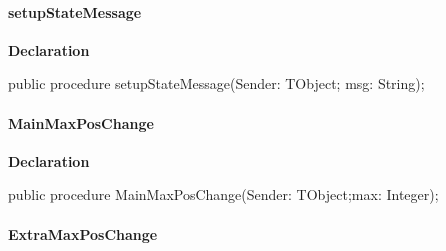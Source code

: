 \documentclass{report}
\newif\ifpdf
\begin{document}
\paragraph*{setupStateMessage}\hspace*{\fill}

\label{igobase.TIWizFrm-setupStateMessage}
\begin{list}{}{
\setlength{\itemindent}{0cm}
\setlength{\listparindent}{0cm}
\setlength{\leftmargin}{\evensidemargin}
\addtolength{\leftmargin}{\tmplength}
\settowidth{\labelsep}{X}
\addtolength{\leftmargin}{\labelsep}
\setlength{\labelwidth}{\tmplength}
}
\item[\textbf{Declaration}\hfill]
\ifpdf
\begin{flushleft}
\fi
\begin{ttfamily}
public procedure setupStateMessage(Sender: TObject; msg: String);\end{ttfamily}

\ifpdf
\end{flushleft}
\fi

\end{list}
\paragraph*{MainMaxPosChange}\hspace*{\fill}

\label{igobase.TIWizFrm-MainMaxPosChange}
\begin{list}{}{
\setlength{\itemindent}{0cm}
\setlength{\listparindent}{0cm}
\setlength{\leftmargin}{\evensidemargin}
\addtolength{\leftmargin}{\tmplength}
\settowidth{\labelsep}{X}
\addtolength{\leftmargin}{\labelsep}
\setlength{\labelwidth}{\tmplength}
}
\item[\textbf{Declaration}\hfill]
\ifpdf
\begin{flushleft}
\fi
\begin{ttfamily}
public procedure MainMaxPosChange(Sender: TObject;max: Integer);\end{ttfamily}

\ifpdf
\end{flushleft}
\fi

\end{list}
\paragraph*{ExtraMaxPosChange}\hspace*{\fill}
\end{document}
